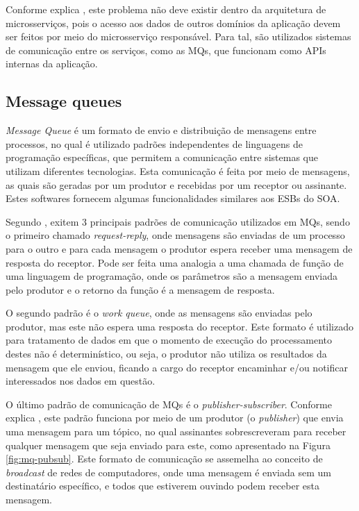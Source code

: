 Conforme explica , este problema não deve existir
dentro da arquitetura de microsserviços, pois o acesso aos dados de outros
domínios da aplicação devem ser feitos por meio do microsserviço responsável.
Para tal, são utilizados sistemas de comunicação entre os serviços, como
as \acp{MQ}, que funcionam como \acp{API} internas da aplicação.

\subsection{Message queues}

\emph{Message Queue} é um formato de envio e distribuição de mensagens
entre processos, no qual é utilizado padrões independentes de linguagens
de programação específicas, que permitem a comunicação entre sistemas que
utilizam diferentes tecnologias. Esta comunicação é feita por meio de
mensagens, as quais são geradas por um produtor e recebidas por um receptor
ou assinante. Estes softwares fornecem algumas funcionalidades similares aos
\acp{ESB} do \ac{SOA}.

Segundo , exitem 3 principais padrões de comunicação
utilizados em \acp{MQ}, sendo o primeiro chamado \emph{request-reply}, onde
mensagens são enviadas de um processo para o outro e para cada mensagem o
produtor espera receber uma mensagem de resposta do receptor. Pode ser feita
uma analogia a uma chamada de função de uma linguagem de programação, onde os
parâmetros são a mensagem enviada pelo produtor e o retorno da função é a
mensagem de resposta.

O segundo padrão é o \emph{work queue}, onde as mensagens são enviadas pelo
produtor, mas este não espera uma resposta do receptor. Este formato é
utilizado para tratamento de dados em que o momento de execução do
processamento destes não é determinístico, ou seja, o produtor não utiliza
os resultados da mensagem que ele enviou, ficando a cargo do receptor
encaminhar e/ou notificar interessados nos dados em questão.

O último padrão de comunicação de \acp{MQ} é o \emph{publisher-subscriber}.
Conforme explica , este padrão funciona por meio de
um produtor (o \emph{publisher}) que envia uma mensagem para um tópico, no
qual assinantes sobrescreveram para receber qualquer mensagem que seja
enviado para este, como apresentado na Figura \ref{fig:mq-pubsub}. Este
formato de comunicação se assemelha ao conceito de \emph{broadcast} de redes
de computadores, onde uma mensagem é enviada sem um destinatário específico,
e todos que estiverem ouvindo podem receber esta mensagem.

